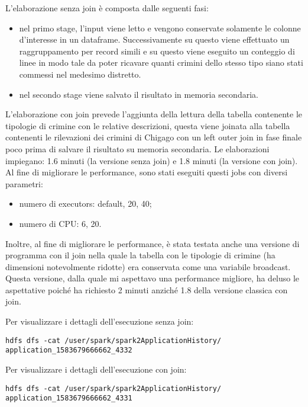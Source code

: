 \documentclass[10pt]{article}
\begin{document}
L’elaborazione senza join è composta dalle seguenti fasi:
\begin{itemize}
\item nel primo stage, l’input viene letto e vengono conservate solamente le colonne d’interesse in un dataframe. Successivamente su questo viene effettuato un raggruppamento per record simili e su questo viene eseguito un conteggio di linee in modo tale da poter ricavare quanti crimini dello stesso tipo siano stati commessi nel medesimo distretto.
\item nel secondo stage viene salvato il risultato in memoria secondaria.	
\end{itemize}
L’elaborazione con join prevede l’aggiunta della lettura della tabella contenente le tipologie di crimine con le relative descrizioni, questa viene joinata alla tabella contenenti le rilevazioni dei crimini di Chigago con un left outer join in fase finale poco prima di salvare il risultato su memoria secondaria.
Le elaborazioni impiegano: 1.6 minuti (la versione senza join) e 1.8 minuti (la versione con join).
Al fine di migliorare le performance, sono stati eseguiti questi jobs con diversi parametri:
\begin{itemize}
\item numero di executors: default, 20, 40;
\item numero di CPU: 6, 20.
\end{itemize}
Inoltre, al fine di migliorare le performance, è stata testata anche una versione di programma con il join nella quale la tabella con le tipologie di crimine (ha dimensioni notevolmente ridotte) era conservata come una variabile broadcast. Questa versione, dalla quale mi aspettavo una performance migliore, ha deluso le aspettative poiché ha richiesto 2 minuti anziché 1.8 della versione classica con join.

Per visualizzare i dettagli dell’esecuzione senza join:
\begin{lstlisting}
hdfs dfs -cat /user/spark/spark2ApplicationHistory/
application_1583679666662_4332
\end{lstlisting}
Per visualizzare i dettagli dell’esecuzione con join:
\begin{lstlisting}
hdfs dfs -cat /user/spark/spark2ApplicationHistory/
application_1583679666662_4331
\end{lstlisting}
\end{document}

